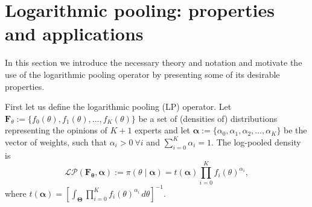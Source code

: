 \documentclass[a4paper, notitlepage, 11pt]{article}
\begin{document}
\section{Logarithmic pooling: properties and applications}
\label{sec:background}

In this section we introduce the necessary theory and notation and motivate the use of the logarithmic pooling operator by presenting some of its desirable properties.

First let us define the logarithmic pooling (LP) operator.
Let $\mathbf{F}_{\theta} := \{f_0(\theta), f_1(\theta), \ldots, f_K(\theta)\}$ be a set of (densities of) distributions representing the opinions of $K+1$ experts and let $\boldsymbol\alpha :=\{\alpha_0, \alpha_1, \alpha_2, \ldots, \alpha_K \}$ be the vector of weights, such that $\alpha_i > 0\: \forall i$ and $\sum_{i=0}^K \alpha_i = 1$.
The log-pooled density is
\begin{equation}
\label{eq:logpool}
 \mathcal{LP}(\mathbf{F_\theta}, \boldsymbol\alpha) := \pi(\theta \mid \boldsymbol\alpha) = t(\boldsymbol\alpha) \prod_{i=0}^K f_i(\theta)^{\alpha_i},
\end{equation}
where $t(\boldsymbol\alpha) = \left[ \int_{\boldsymbol\Theta}\prod_{i=0}^K f_i(\theta)^{\alpha_i}\, d\theta \right]^{-1}$.
\end{document}
